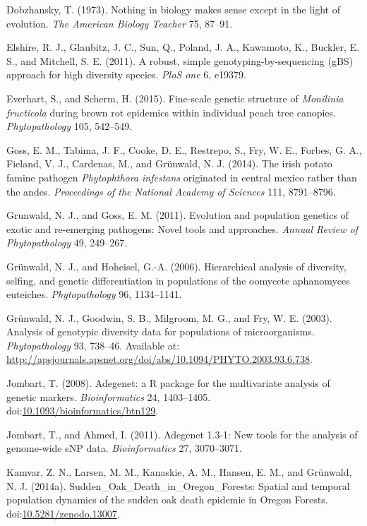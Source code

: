 \documentclass{frontiersSCNS} %
\begin{document}
Dobzhansky, T. (1973). Nothing in biology makes sense except in the
light of evolution. \emph{The American Biology Teacher} 75, 87--91.

Elshire, R. J., Glaubitz, J. C., Sun, Q., Poland, J. A., Kawamoto, K.,
Buckler, E. S., and Mitchell, S. E. (2011). A robust, simple
genotyping-by-sequencing (gBS) approach for high diversity species.
\emph{PloS one} 6, e19379.

Everhart, S., and Scherm, H. (2015). Fine-scale genetic structure of
\emph{Monilinia fructicola} during brown rot epidemics within individual
peach tree canopies. \emph{Phytopathology} 105, 542--549.

Goss, E. M., Tabima, J. F., Cooke, D. E., Restrepo, S., Fry, W. E.,
Forbes, G. A., Fieland, V. J., Cardenas, M., and Gr{ü}nwald, N. J.
(2014). The irish potato famine pathogen \emph{Phytophthora infestans}
originated in central mexico rather than the andes. \emph{Proceedings of
the National Academy of Sciences} 111, 8791--8796.

Grunwald, N. J., and Goss, E. M. (2011). Evolution and population
genetics of exotic and re-emerging pathogens: Novel tools and
approaches. \emph{Annual Review of Phytopathology} 49, 249--267.

Gr{ü}nwald, N. J., and Hoheisel, G.-A. (2006). Hierarchical analysis of
diversity, selfing, and genetic differentiation in populations of the
oomycete aphanomyces euteiches. \emph{Phytopathology} 96, 1134--1141.

Grünwald, N. J., Goodwin, S. B., Milgroom, M. G., and Fry, W. E. (2003).
Analysis of genotypic diversity data for populations of microorganisms.
\emph{Phytopathology} 93, 738--46. Available at:
\url{http://apsjournals.apsnet.org/doi/abs/10.1094/PHYTO.2003.93.6.738}.

Jombart, T. (2008). Adegenet: a R package for the multivariate analysis
of genetic markers. \emph{Bioinformatics} 24, 1403--1405.
doi:\href{http://dx.doi.org/10.1093/bioinformatics/btn129}{10.1093/bioinformatics/btn129}.

Jombart, T., and Ahmed, I. (2011). Adegenet 1.3-1: New tools for the
analysis of genome-wide sNP data. \emph{Bioinformatics} 27, 3070--3071.

Kamvar, Z. N., Larsen, M. M., Kanaskie, A. M., Hansen, E. M., and
Grünwald, N. J. (2014a). Sudden\_Oak\_Death\_in\_Oregon\_Forests:
Spatial and temporal population dynamics of the sudden oak death
epidemic in Oregon Forests.
doi:\href{http://dx.doi.org/10.5281/zenodo.13007}{10.5281/zenodo.13007}.
\end{document}
